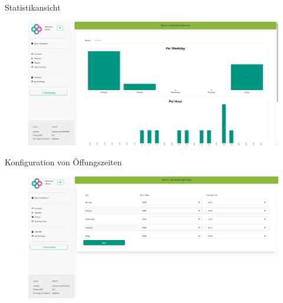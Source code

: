 \begin{frame}{Statistikansicht}
    \thispagestyle{plain}
    \begin{figure}
        \centering
        \includegraphics[width=1\linewidth]{pictures/admin_statistics.png}
        \label{fig:enter-label}
    \end{figure}
\end{frame}

\begin{frame}{Konfiguration von Öffungszeiten}
    \thispagestyle{plain}
    \begin{figure}
        \centering
        \includegraphics[width=1\linewidth]{pictures/admin_opening_hours.png}
        \label{fig:enter-label}
    \end{figure}
\end{frame}
